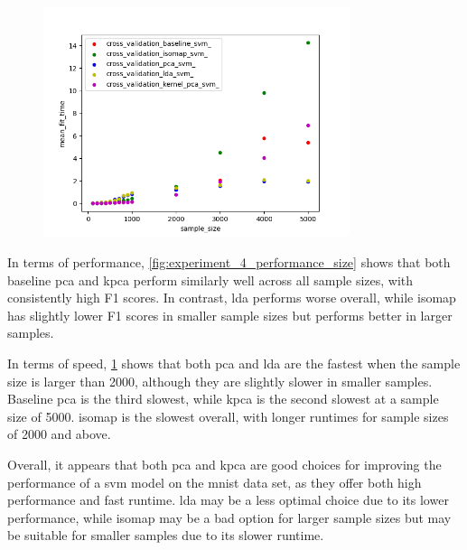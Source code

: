 \begin{figure}[htb!]
    \centering
    \includegraphics[width=0.8\textwidth]{figures/time_based_on_size.png}
    \caption{}
    \label{fig:experiment_4_speed_size}
\end{figure}


In terms of performance, \ref{fig:experiment_4_performance_size} shows that both baseline \gls{pca} and \gls{kpca} perform similarly well across all sample sizes, with consistently high F1 scores. In contrast, \gls{lda} performs worse overall, while \gls{isomap} has slightly lower F1 scores in smaller sample sizes but performs better in larger samples.

In terms of speed, \ref{fig:experiment_4_speed_size} shows that both \gls{pca} and \gls{lda} are the fastest when the sample size is larger than 2000, although they are slightly slower in smaller samples. Baseline \gls{pca} is the third slowest, while \gls{kpca} is the second slowest at a sample size of 5000. \gls{isomap} is the slowest overall, with longer runtimes for sample sizes of 2000 and above.

Overall, it appears that both \gls{pca} and \gls{kpca} are good choices for improving the performance of a \gls{svm} model on the \gls{mnist} data set, as they offer both high performance and fast runtime. \gls{lda} may be a less optimal choice due to its lower performance, while \gls{isomap} may be a bad option for larger sample sizes but may be suitable for smaller samples due to its slower runtime.


